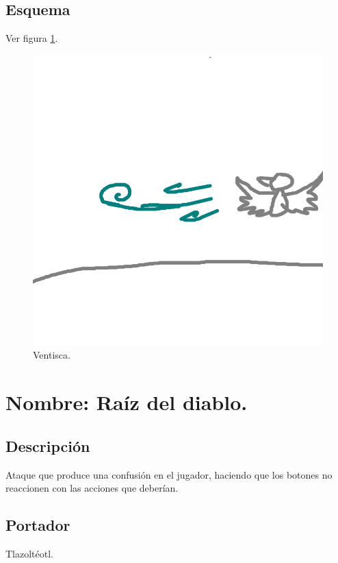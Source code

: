 \subsection{Esquema}
			Ver figura \ref{fig:ventisca}.
			\begin{figure}
				\centering
				\includegraphics[height=0.2 \textheight]{Imagenes/ventisca}
				\caption{Ventisca.}
				\label{fig:ventisca}
			\end{figure}

\section{Nombre: Raíz del diablo.}\label{hab.RaizDia}
\subsection{Descripción}
Ataque que produce una confusión en el jugador, haciendo que los botones no reaccionen con las acciones que deberían.
\subsection{Portador}
Tlazoltéotl.
